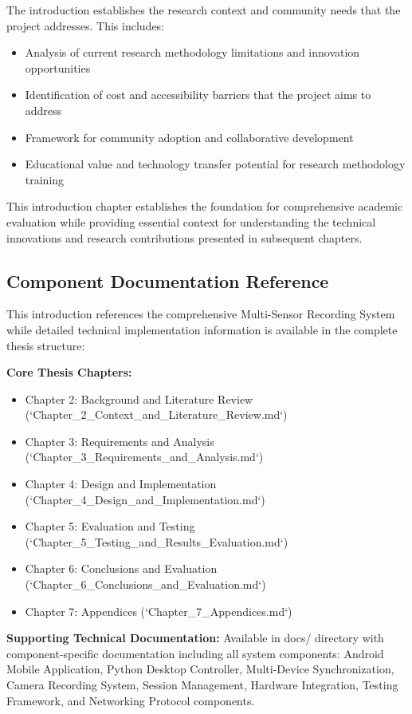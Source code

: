 \documentclass[11pt,a4paper]{report}
\begin{document}
The introduction establishes the research context and community needs that the project addresses. This includes:

\begin{itemize}
\item Analysis of current research methodology limitations and innovation opportunities
\item Identification of cost and accessibility barriers that the project aims to address
\item Framework for community adoption and collaborative development
\item Educational value and technology transfer potential for research methodology training

\end{itemize}
This introduction chapter establishes the foundation for comprehensive academic evaluation while providing essential
context for understanding the technical innovations and research contributions presented in subsequent chapters.

\subsection{Component Documentation Reference}

This introduction references the comprehensive Multi-Sensor Recording System while detailed technical implementation
information is available in the complete thesis structure:

\textbf{Core Thesis Chapters:}

\begin{itemize}
\item Chapter 2: Background and Literature Review (`Chapter_2_Context_and_Literature_Review.md`)
\item Chapter 3: Requirements and Analysis (`Chapter_3_Requirements_and_Analysis.md`)
\item Chapter 4: Design and Implementation (`Chapter_4_Design_and_Implementation.md`)
\item Chapter 5: Evaluation and Testing (`Chapter_5_Testing_and_Results_Evaluation.md`)
\item Chapter 6: Conclusions and Evaluation (`Chapter_6_Conclusions_and_Evaluation.md`)
\item Chapter 7: Appendices (`Chapter_7_Appendices.md`)

\end{itemize}
\textbf{Supporting Technical Documentation:}
Available in docs/ directory with component-specific documentation including
all system components: Android Mobile Application, Python Desktop Controller, Multi-Device Synchronization,
Camera Recording System, Session Management, Hardware Integration, Testing Framework, and Networking Protocol
components.
\end{document}
